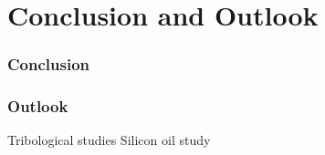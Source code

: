 \part{Conclusion and Outlook}
\section{Conclusion}
\section{Outlook}
Tribological studies
Silicon oil study